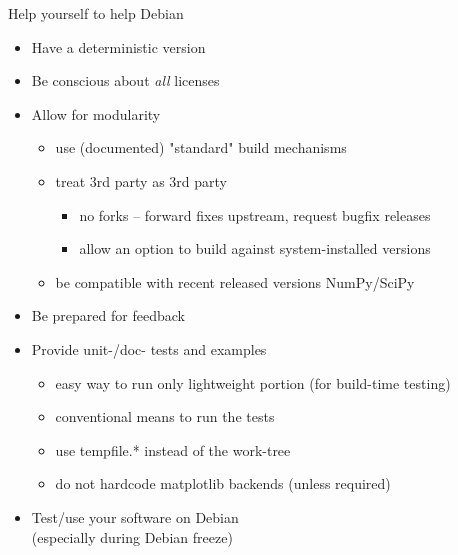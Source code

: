 \documentclass[]{beamer}
\begin{document}
\begin{frame}{Help yourself to help Debian}
\begin{itemize}
\item Have a \alert{deterministic version}
\item Be conscious about \emph{all} \alert{licenses}
\item Allow for \alert{modularity}
  \begin{itemize}
  \item use (documented) "standard" build mechanisms
  \item treat 3rd party as 3rd party
    \begin{itemize}
    \item no forks -- forward fixes upstream, request bugfix releases
    \item allow an option to build against system-installed versions
    \end{itemize}
  \item be compatible with recent released versions NumPy/SciPy
  \end{itemize}
\item Be prepared for \alert{feedback}
\item Provide unit-/doc- \alert{tests} and examples
  \begin{itemize}
  \item easy way to run only lightweight portion (for build-time testing)
  \item conventional means to run the tests
  \item use tempfile.* instead of the work-tree
  \item do not hardcode matplotlib backends (unless required)
  \end{itemize}
\item Test/use your software on Debian\\
  (especially during Debian freeze)
\end{itemize}


\end{frame}
\end{document}
